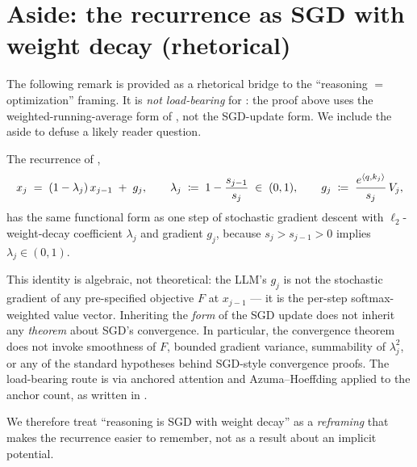 \section{Aside: the recurrence as SGD with weight decay (rhetorical)}
\label{sec:sgd_aside}

The following remark is provided as a rhetorical bridge to the
``reasoning $=$ optimization'' framing. It is \emph{not load-bearing} for
: the proof above uses the
weighted-running-average form of , not the
SGD-update form. We include the aside to defuse a likely reader question.

\begin{remark}\label{rem:sgd_aside_remark}
The recurrence  of ,
\begin{align*}
   x_j \;=\; (1 - \lambda_j)\, x_{j-1} \;+\; g_j,
   \qquad
   \lambda_j \;\coloneqq\; 1 - \frac{s_{j-1}}{s_j}
   \;\in\; (0, 1),
   \qquad
   g_j \;\coloneqq\; \frac{e^{\left\langle q, k_j \right\rangle}}{s_j}\, V_j,
\end{align*}
has the same functional form as one step of stochastic gradient descent
with $\ell_2$-weight-decay coefficient $\lambda_j$ and gradient $g_j$,
because $s_j > s_{j-1} > 0$ implies $\lambda_j \in (0, 1)$.

This identity is algebraic, not theoretical: the LLM's $g_j$ is not the
stochastic gradient of any pre-specified objective $F$ at $x_{j-1}$ ---
it is the per-step softmax-weighted value vector. Inheriting the
\emph{form} of the SGD update does not inherit any \emph{theorem} about
SGD's convergence. In particular, the convergence theorem
 does not invoke smoothness of $F$,
bounded gradient variance, summability of $\lambda_j^2$, or any of the
standard hypotheses behind SGD-style convergence proofs.
The load-bearing route is via anchored attention and Azuma--Hoeffding
applied to the anchor count, as written in
.

We therefore treat ``reasoning is SGD with weight decay'' as a
\emph{reframing} that makes the recurrence  easier to
remember, not as a result about an implicit potential.
\end{remark}
